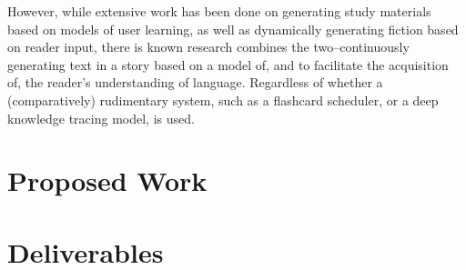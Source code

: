 \documentclass[
	letterpaper, %
]{jdf}
\begin{document}
However, while extensive work has been done on generating study materials based on models of user learning, as well as dynamically generating fiction based on reader input, there is known research combines the two–continuously generating text in a story based on a model of, and to facilitate the acquisition of, the reader's understanding of language. Regardless of whether a (comparatively) rudimentary system, such as a flashcard scheduler, or a deep knowledge tracing model, is used.


\section{Proposed Work}


\section{Deliverables}
\end{document}
